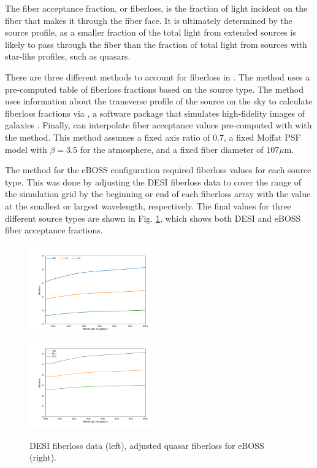 The fiber acceptance fraction, or fiberloss, is the fraction of light incident on the fiber that makes it through the fiber face. It is ultimately determined by the source profile, as a smaller fraction of the total light from extended sources is likely to pass through the fiber than the fraction of total light from sources with star-like profiles, such as quasars.

There are three different methods to account for fiberloss in . The  method uses a pre-computed table of fiberloss fractions based on the source type. The  method uses information about the transverse profile of the source on the sky to calculate fiberloss fractions via , a software package that simulates high-fidelity images of galaxies \cite{Rowe_2015}. Finally,  can interpolate fiber acceptance values pre-computed with  with the  method. This method assumes a fixed axis ratio of 0.7, a fixed Moffat PSF model with $\beta=3.5$ for the atmosphere, and a fixed fiber diameter of $107 \mu$m. 

The  method for the eBOSS configuration required fiberloss values for each source type. This was done by adjusting the DESI fiberloss data to cover the range of the simulation grid by the beginning or end of each fiberloss array with the value at the smallest or largest wavelength, respectively. The final values for three different source types are shown in Fig. \ref{fig:qso_fiberloss}, which shows both DESI and eBOSS fiber acceptance fractions.

\begin{figure}[h]
    \centering
    \includegraphics[width=0.495\textwidth]{images/specsim/desimodel-fiberloss.png}
    \includegraphics[width=0.495\textwidth]{images/specsim/eboss_fiberloss.png}
    \caption{DESI fiberloss data (left), adjusted quasar fiberloss for eBOSS (right).}
    \label{fig:qso_fiberloss}
\end{figure}

